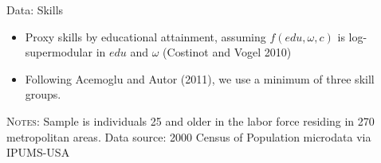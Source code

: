 \documentclass[10pt,notes=hide]{beamer}
\begin{document}
\begin{frame}{Data: Skills}
\begin{itemize}
\item Proxy skills by educational attainment, assuming $f(edu,\omega,c)$
is log-supermodular in $edu$ and $\omega$ (Costinot and Vogel 2010)
\item Following Acemoglu and Autor (2011), we use a minimum of three skill
groups.
\end{itemize}
\resizebox{\textwidth}{!}{}
\begin{minipage}{.9\textwidth}\begin{center}
\scriptsize{\flushleft \textsc{Notes}: Sample is individuals 25 and older in the labor force residing in 270 metropolitan areas. Data source: 2000 Census of Population microdata via IPUMS-USA\par}
\end{center}\end{minipage}


\end{frame}
\end{document}
